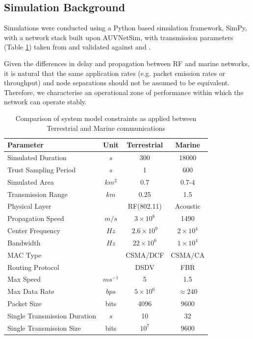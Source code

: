\documentclass[conference]{IEEEtran}
\begin{document}
\subsection{Simulation Background}

Simulations were conducted using a Python based simulation framework, SimPy\cite{Mueller2003SimPy}, with a network stack built upon AUVNetSim\cite{Miquel2008}, with transmission parameters (Table \ref{tab:sysconstraints}) taken from and validated against \cite{Stojanovic2007} and \cite{Stefanov2011}.

Given the differences in delay and propagation between RF and marine networks, it is natural that the same application rates (e.g. packet emission rates or throughput) and node separations should not be assumed to be equivalent.
Therefore, we characterise an operational zone of performance within which the network can operate stably.
%
\begin{table}[h]
  \caption{Comparison of system model constraints as applied between Terrestrial and Marine communications} \label{tab:sysconstraints}
  \begin{center}
    \setlength{\tabcolsep}{8pt}
    \begin{tabular}{lccc}
      \toprule
      Parameter & Unit & Terrestrial & Marine \\
      \midrule
      Simulated Duration & $s$ & 300 & 18000\\
      Trust Sampling Period & $s$ & 1 & 600 \\
      Simulated Area & $km^2$ & 0.7 & 0.7-4 \\
      Transmission Range & $km$ & 0.25 & 1.5 \\
      Physical Layer & & RF(802.11) & Acoustic\\
      Propagation Speed& $m/s$ & $3\times10^8$ & 1490\\
      Center Frequency& $Hz$ & $2.6\times10^9$ & $2 \times 10^4$ \\
      Bandwidth& $Hz$ & $22\times10^6$ & $1\times10^4$\\
      MAC Type & & CSMA/DCF & CSMA/CA\\
      Routing Protocol & & DSDV & FBR \\
      Max Speed & $ms^{-1}$ & 5 & 1.5 \\
      Max Data Rate & $bps$ & $5\times10^6$ & $\approx 240$ \\
      Packet Size & bits & 4096 &  9600 \\
      Single Transmission Duration & $s$ & 10 & 32 \\
      Single Transmission Size & bits & $10^7$ & $9600$ \\
      \bottomrule
    \end{tabular}
    \setlength{\tabcolsep}{6pt}
  \end{center}
\end{table}
%
\end{document}
